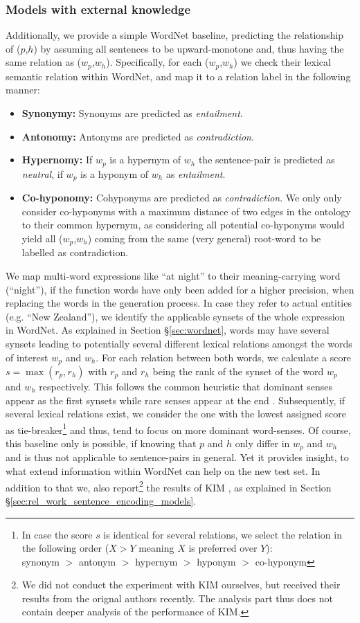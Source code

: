 \subsubsection{Models with external knowledge}
Additionally, we provide a simple WordNet baseline, predicting the relationship of ($p$,$h$) by assuming all sentences to be upward-monotone and, thus having the same relation as ($w_p$,$w_h$). Specifically, for each ($w_p$,$w_h$) we check their lexical semantic relation within WordNet, and map it to a relation label in the following manner:
\begin{itemize}
\item \textbf{Synonymy:} Synonyms are predicted as \textit{entailment}.
\item \textbf{Antonomy:} Antonyms are predicted as \textit{contradiction}.
\item \textbf{Hypernomy:} If $w_p$ is a hypernym of $w_h$ the sentence-pair is predicted as \textit{neutral}, if $w_p$ is a hyponym of $w_h$ as \textit{entailment}.
\item \textbf{Co-hyponomy:} Cohyponyms are predicted as \textit{contradiction}. We only only consider co-hyponyms with a maximum distance of two edges in the ontology to their common hypernym, as considering all potential co-hyponyms would yield all ($w_p$,$w_h$) coming from the same (very general) root-word to be labelled as contradiction.
\end{itemize}
We map multi-word expressions like ``at night'' to their meaning-carrying word (``night''), if the function words have only been added for a higher precision, when replacing the words in the generation process. In case they refer to actual entities (e.g. ``New Zealand''), we identify the applicable synsets of the whole expression in WordNet. As explained in Section §\ref{sec:wordnet}, words may have several synsets leading to potentially several different lexical relations amongst the words of interest $w_p$ and $w_h$. For each relation between both words, we calculate a score $s=\max(r_p,r_h)$ with $r_p$ and $r_h$ being the rank of the synset of the word $w_p$ and $w_h$ respectively. This follows the common heuristic that dominant senses appear as the first synsets while rare senses appear at the end \citep{mccarthy2004using}. Subsequently, if several lexical relations exist, we consider the one with the lowest assigned score as tie-breaker\footnote{In case the score $s$ is identical for several relations, we select the relation in the following order ($X > Y$ meaning $X$ is preferred over $Y$):\\ synonym $>$ antonym $>$ hypernym $>$ hyponym $>$ co-hyponym } and thus, tend to focus on more dominant word-senses. Of course, this baseline only is possible, if knowing that $p$ and $h$ only differ in $w_p$ and $w_h$ and is thus not applicable to sentence-pairs in general. Yet it provides insight, to what extend information within WordNet can help on the new test set. In addition to that we, also report\footnote{We did not conduct the experiment with \ac{KIM} ourselves, but received their results from the orignal authors recently. The analysis part thus does not contain deeper analysis of the performance of KIM.} the results of \ac{KIM} \citep{chen2017natural}, as explained in Section §\ref{sec:rel_work_sentence_encoding_models}.
